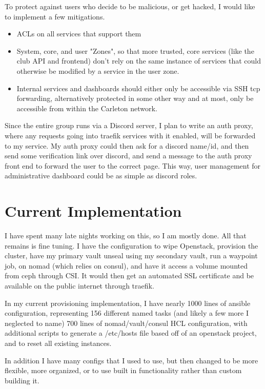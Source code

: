 \documentclass{article}
\begin{document}
To protect against users who decide to be malicious, or get hacked, I would like to implement a few mitigations.
\begin{itemize}
    \item ACLs on all services that support them
    \item System, core, and user "Zones", so that more trusted, core services (like the club API and frontend) don't rely on the same instance of services that could otherwise be modified by a service in the user zone.
    \item Internal services and dashboards should either only be accessible via SSH tcp forwarding, alternatively protected in some other way and at most, only be accessible from within the Carleton network.
\end{itemize}
Since the entire group runs via a Discord server, I plan to write an auth proxy, where any requests going into traefik services with it enabled, will be forwarded to my service. My auth proxy could then ask for a discord name/id, and then send some verification link over discord, and send a message to the auth proxy front end to forward the user to the correct page. This way, user management for administrative dashboard could be as simple as discord roles.


\section{Current Implementation}
I have spent many late nights working on this, so I am mostly done. All that remains is fine tuning. I have the configuration to wipe Openstack, provision the cluster, have my primary vault unseal using my secondary vault, run a waypoint job, on nomad (which relies on consul), and have it access a volume mounted from ceph through CSI. It would then get an automated SSL certificate and be available on the public internet through traefik.

In my current provisioning implementation, I have nearly 1000 lines of ansible configuration, representing 156 different named tasks (and likely a few more I neglected to name) 700 lines of nomad/vault/consul HCL configuration, with additional scripts to generate a /etc/hosts file based off of an openstack project, and to reset all existing instances.

In addition I have many configs that I used to use, but then changed to be more flexible, more organized, or to use built in functionality rather than custom building it.
\end{document}
